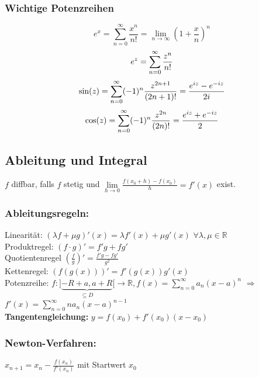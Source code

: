 \documentclass[6pt,a4paper]{scrartcl}
\newcommand{\enbrace}[1]{\ensuremath{\left(#1\right)}}
\begin{document}
\begin{multicols*}{4}
\subsubsection{Wichtige Potenzreihen}
\label{sub:potenzreihen}
\begin{equation}
 	e^x = \sum_{n = 0}^{\infty} \frac{x^n}{n!} = \lim\limits_{n\to\infty}\enbrace{1+\frac{x}{n}}^n
\end{equation}
\begin{equation}
 	e^z = \sum_{n = 0}^{\infty} \frac{z^n}{n!} \\
\end{equation}
\begin{equation}
	 \sin (z) = \sum_{n = 0}^{\infty} (-1)^n \frac{z^{2n +1}}{(2n +1)!} = \frac{e^{iz} - e^{-iz}}{2i} \\
\end{equation}
\begin{equation}
	 \cos (z) = \sum_{n = 0}^{\infty} (-1)^n \frac{z^{2n}}{(2n)!} = \frac{e^{iz} + e^{-iz}}{2}\\
 \end{equation}





\subsection{Ableitung und Integral}
$f$ diffbar, falls $f$ stetig und $\underset{h\rightarrow 0}{\lim}\frac{f(x_0+h)-f(x_0)}{h}=f'(x)$ exist.
\subsubsection{Ableitungsregeln:}
Linearität: $(\lambda f + \mu g)' (x) = \lambda f'(x) + \mu g'(x)$ \quad $\forall \lambda, \mu \in \mathbb R$ \\
Produktregel: $(f \cdot g)' = f' g + f g'$\\
Quotientenregel $\enbrace{\frac{f}{g}}' = \frac{f'g - fg'}{g^2}$\\
Kettenregel: $\left( f(g(x)) \right)' = f'(g(x)) g'(x)$\\
Potenzreihe: $f: ] \underbrace{-R+a, a+R}_{\subseteq D}	 [ \rightarrow \mathbb R, f(x) = \sum_{n=0}^{\infty} a_n (x -a)^n$ \quad $\Rightarrow$ \quad $f'(x) = \sum_{n=0}^{\infty} n a_{n} (x-a)^{n-1}$\\
\textbf{Tangentengleichung:} $y=f(x_0)+f'(x_0)(x-x_0)$

\subsubsection{Newton-Verfahren:}
$x_{n+1}=x_n-\frac{f(x_n)}{f'(x_n)}$ mit Startwert $x_0$


\end{multicols*}
\end{document}
